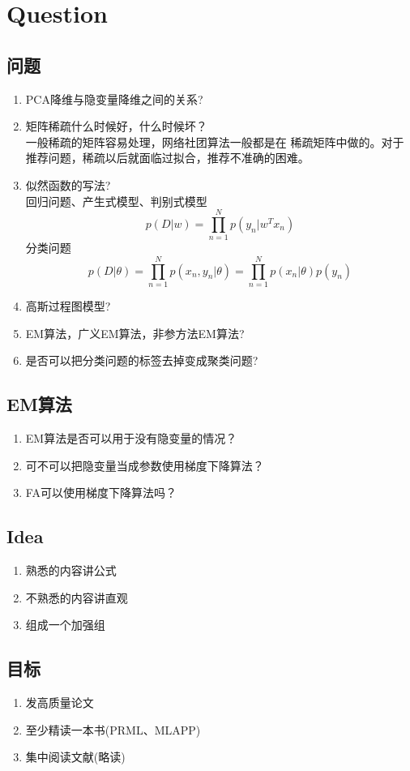 \chapter{Question}
\section{问题}

\begin{enumerate}
\item PCA降维与隐变量降维之间的关系?\\
\item 矩阵稀疏什么时候好，什么时候坏？\\
一般稀疏的矩阵容易处理，网络社团算法一般都是在
稀疏矩阵中做的。对于推荐问题，稀疏以后就面临过拟合，推荐不准确的困难。
\item 似然函数的写法?\\
回归问题、产生式模型、判别式模型
\begin{equation}
p(D|w) = \prod^N_{n=1} p(y_n|w^Tx_n)
\end{equation}
分类问题
\begin{equation}
p(D|\theta) = \prod_{n=1}^N p(x_n, y_n|\theta)
= \prod_{n=1}^Np(x_n|\theta)p(y_n)
\end{equation}
\item 高斯过程图模型?
\item EM算法，广义EM算法，非参方法EM算法?
\item 是否可以把分类问题的标签去掉变成聚类问题?
\end{enumerate}

\section{EM算法}
\begin{enumerate}
\item EM算法是否可以用于没有隐变量的情况？
\item 可不可以把隐变量当成参数使用梯度下降算法？
\item FA可以使用梯度下降算法吗？
\end{enumerate}
\section{Idea}
\begin{enumerate}
\item 熟悉的内容讲公式
\item 不熟悉的内容讲直观
\item 组成一个加强组 
\end{enumerate}

\section{目标}
\begin{enumerate}
\item 发高质量论文
\item 至少精读一本书(PRML、MLAPP)
\item 集中阅读文献(略读)
\end{enumerate}

